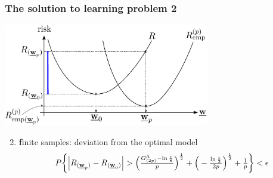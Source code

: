 
\begin{frame}\frametitle{The solution to learning problem 2} 
	\begin{center}
		\includegraphics[width=9cm]{img/section2_fig1_question1}
	\end{center}
	\begin{enumerate}\setcounter{enumi}{1}
		\item {\textbf finite samples:} deviation from the optimal model
			\vspace{-2mm}
			$$
				P\bigg\{ {%
				\Big| R_{(\vec w_p)} - R_{(\vec w_0)} \Big| }
					> \Big(\smallfrac{G^\Lambda_{(2p)} 
						- \ln \frac{\epsilon}{8}}{p} \Big)^\frac{1}{2}
					+ \Big(-\smallfrac{\ln \frac{\epsilon}{2}}{2p} 
						\Big)^\frac{1}{2} + \smallfrac{1}{p}
				\bigg\} < \epsilon
			$$
			\vspace{-4mm}
	\end{enumerate}
\end{frame}

